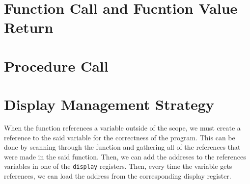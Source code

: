 \documentclass{article}
\begin{document}
\section{Function Call and Fucntion Value Return}

\section{Procedure Call}

\section{Display Management Strategy}

When the function references a variable outside of the scope, we must create a reference to the said variable for the correctness of the program. This can be done by scanning through the function and gathering all of the references that were made in the said function. Then, we can add the addreses to the references variables in one of the {\tt display} registers. Then, every time the variable gets references, we can load the address from the corresponding display register.

\end{document}
